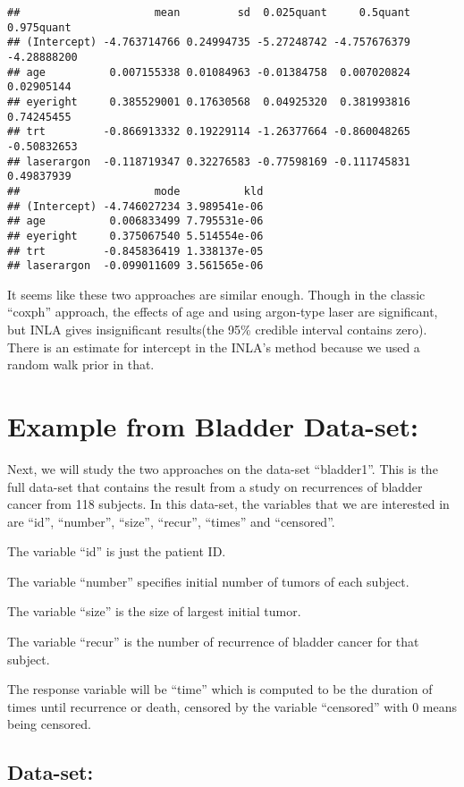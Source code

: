 \documentclass[]{article}
\begin{document}
\begin{verbatim}
##                     mean         sd  0.025quant     0.5quant  0.975quant
## (Intercept) -4.763714766 0.24994735 -5.27248742 -4.757676379 -4.28888200
## age          0.007155338 0.01084963 -0.01384758  0.007020824  0.02905144
## eyeright     0.385529001 0.17630568  0.04925320  0.381993816  0.74245455
## trt         -0.866913332 0.19229114 -1.26377664 -0.860048265 -0.50832653
## laserargon  -0.118719347 0.32276583 -0.77598169 -0.111745831  0.49837939
##                     mode          kld
## (Intercept) -4.746027234 3.989541e-06
## age          0.006833499 7.795531e-06
## eyeright     0.375067540 5.514554e-06
## trt         -0.845836419 1.338137e-05
## laserargon  -0.099011609 3.561565e-06
\end{verbatim}

It seems like these two approaches are similar enough. Though in the
classic ``coxph'' approach, the effects of age and using argon-type
laser are significant, but INLA gives insignificant results(the 95\%
credible interval contains zero). There is an estimate for intercept in
the INLA's method because we used a random walk prior in that.

\hypertarget{example-from-bladder-data-set}{%
\section{Example from Bladder
Data-set:}\label{example-from-bladder-data-set}}

Next, we will study the two approaches on the data-set ``bladder1''.
This is the full data-set that contains the result from a study on
recurrences of bladder cancer from 118 subjects. In this data-set, the
variables that we are interested in are ``id'', ``number'', ``size'',
``recur'', ``times'' and ``censored''.

The variable ``id'' is just the patient ID.

The variable ``number'' specifies initial number of tumors of each
subject.

The variable ``size'' is the size of largest initial tumor.

The variable ``recur'' is the number of recurrence of bladder cancer for
that subject.

The response variable will be ``time'' which is computed to be the
duration of times until recurrence or death, censored by the variable
``censored'' with 0 means being censored.

\hypertarget{data-set-1}{%
\subsection{Data-set:}\label{data-set-1}}
\end{document}
